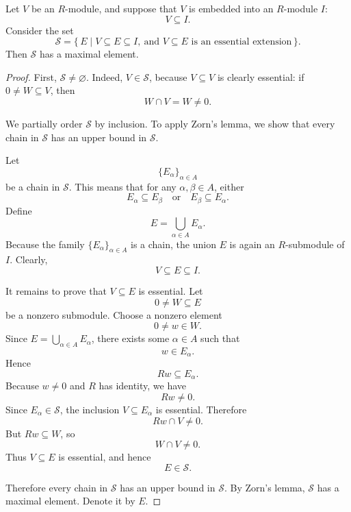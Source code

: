             \begin{lemma}
            Let \(V\) be an \(R\)-module, and suppose that \(V\) is embedded into an \(R\)-module
            \(I\):
            \[
                V\subseteq I.
            \]
            Consider the set
            \[
                \mathcal S
                =
                \{\,E\mid V\subseteq E\subseteq I,\ \text{and }V\subseteq E
                \text{ is an essential extension}\,\}.
            \]
            Then \(\mathcal S\) has a maximal element.
            \end{lemma}
            
            \begin{proof}
            First, \(\mathcal S\neq \varnothing\). Indeed, \(V\in \mathcal S\), because
            \(V\subseteq V\) is clearly essential: if \(0\neq W\subseteq V\), then
            \[
                W\cap V=W\neq 0.
            \]
            
            We partially order \(\mathcal S\) by inclusion. To apply Zorn's lemma, we show that
            every chain in \(\mathcal S\) has an upper bound in \(\mathcal S\).
            
            Let
            \[
                \{E_\alpha\}_{\alpha\in A}
            \]
            be a chain in \(\mathcal S\). This means that for any \(\alpha,\beta\in A\), either
            \[
                E_\alpha\subseteq E_\beta
                \quad\text{or}\quad
                E_\beta\subseteq E_\alpha.
            \]
            Define
            \[
                E=\bigcup_{\alpha\in A}E_\alpha.
            \]
            Because the family \(\{E_\alpha\}_{\alpha\in A}\) is a chain, the union \(E\) is again
            an \(R\)-submodule of \(I\). Clearly,
            \[
                V\subseteq E\subseteq I.
            \]
            
            It remains to prove that \(V\subseteq E\) is essential. Let
            \[
                0\neq W\subseteq E
            \]
            be a nonzero submodule. Choose a nonzero element
            \[
                0\neq w\in W.
            \]
            Since \(E=\bigcup_{\alpha\in A}E_\alpha\), there exists some \(\alpha\in A\) such that
            \[
                w\in E_\alpha.
            \]
            Hence
            \[
                Rw\subseteq E_\alpha.
            \]
            Because \(w\neq 0\) and \(R\) has identity, we have
            \[
                Rw\neq 0.
            \]
            Since \(E_\alpha\in \mathcal S\), the inclusion \(V\subseteq E_\alpha\) is essential.
            Therefore
            \[
                Rw\cap V\neq 0.
            \]
            But \(Rw\subseteq W\), so
            \[
                W\cap V\neq 0.
            \]
            Thus \(V\subseteq E\) is essential, and hence
            \[
                E\in \mathcal S.
            \]
            
            Therefore every chain in \(\mathcal S\) has an upper bound in \(\mathcal S\). By Zorn's
            lemma, \(\mathcal S\) has a maximal element. Denote it by \(E\).
            \end{proof}
            
